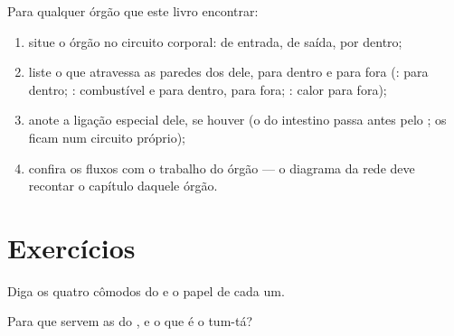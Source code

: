 \begin{method}\label{met:g7:heart-and-circulation:map}
Para qualquer órgão que este livro encontrar:
\begin{enumerate}
  \item situe o órgão no circuito corporal:  de entrada, 
        de saída,  por dentro;
  \item liste o que atravessa as paredes dos  dele, para
        dentro e para fora (:  para dentro;
        : combustível e  para dentro, 
        para fora; : calor para fora);
  \item anote a ligação especial dele, se houver (o  do
        intestino passa antes pelo ; os  ficam num
        circuito próprio);
  \item confira os fluxos com o trabalho do órgão --- o diagrama da
        rede deve recontar o capítulo daquele órgão.
\end{enumerate}
\end{method}

\section{Exercícios}

\begin{exercise}[$\star$]\label{exo:g7:heart-and-circulation:1}
Diga os quatro cômodos do  e o papel de cada um.
\end{exercise}

\begin{exercise}[$\star$]\label{exo:g7:heart-and-circulation:2}
Para que servem as  do , e o que é o tum-tá?
\end{exercise}

